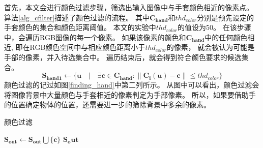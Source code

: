 首先，本文会进行颜色过滤步骤，筛选出输入图像中与手套颜色相近的像素点。
算法\ref{alg_cfilter}描述了颜色过滤的流程。
其中$\bm{C_{hand}}$和$thd_{color}$分别是预先设定的手套颜色的集合和颜色距离阈值。
本文的实验中$thd_{color}$的值设为50。
在该步骤中，会遍历RGB图像的每一个像素。
如果该像素的颜色和$\bm{C_{hand}}$中的任何颜色相近,
即在RGB颜色空间中与相应颜色距离小于$thd_{color}$的像素，
就会被认为可能是手部的像素，并入待选集合中。
遍历结束后，就会得到符合颜色要求的候选集合。
\begin{equation}
    \bm{S_{hand1}} \gets
    \{
    \bm{u} \quad
    | \quad
    \exists \bm{c} \in \bm{C_{hand}} :
    \| \bm{C_i}(\bm{u}) - \bm{c}\| \leq thd_{color}
    \}
\end{equation}
颜色过滤的记过如图\ref{finding_hand}中第二列所示。
从图中可以看出，颜色过滤会将图像背景中大量颜色与手套相近的像素判定为手部像素。
所以，如果要借助手的位置确定物体的位置，还需要进一步的筛除背景中多余的像素。
\begin{algorithm}
    \caption{颜色过滤}
    \label{alg_cfilter}
    \begin{algorithmic}[1]
                    \State $\bm{S_{out}} \gets \bm{S_{out}} \bigcup \{\bm{c}\}$
                    \EndIf
                \EndFor
            \EndFor 
            \State \Return $\bm{S_out}$
        \EndFunction
    \end{algorithmic}
\end{algorithm}

